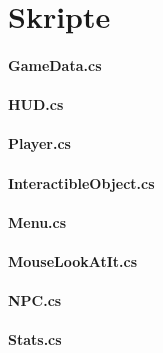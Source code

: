 \chapter{Skripte}

\subsubsection{GameData.cs}


\subsubsection{HUD.cs}


\subsubsection{Player.cs}


\subsubsection{InteractibleObject.cs}


\subsubsection{Menu.cs}


\subsubsection{MouseLookAtIt.cs}


\subsubsection{NPC.cs}


\subsubsection{Stats.cs}


